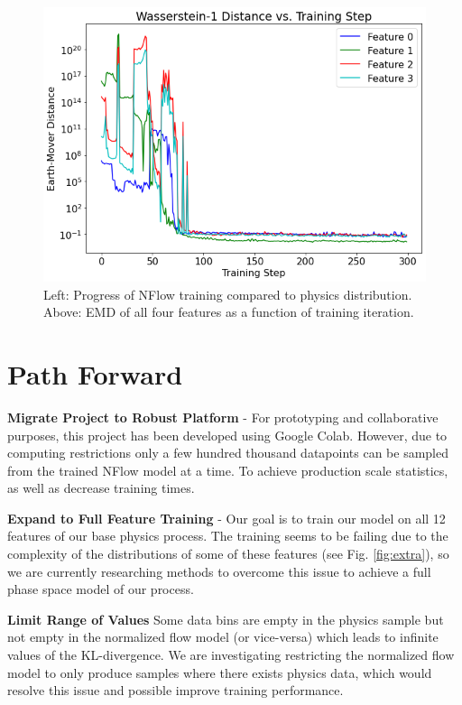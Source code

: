 \begin{figure}[!ht]
\begin{minipage}{0.4\textwidth}
        \centering
        \includegraphics[width=.98\textwidth,trim={0 0 0 0},clip]{pictures/milestoneR2/w1.png}
        \caption{Left: Progress of NFlow training compared to physics distribution. Above: EMD of all four features as a function of training iteration.}
    \end{minipage}
    \label{fig:c}
\end{figure}


\section{Path Forward}
\textbf{Migrate Project to Robust Platform} - For prototyping and collaborative purposes, this project has been developed using Google Colab. However, due to computing restrictions only a few hundred thousand datapoints can be sampled from the trained NFlow model at a time. To achieve production scale statistics, as well as decrease training times. 

\textbf{Expand to Full Feature Training} - Our goal is to train our model on all 12 features of our base physics process. The training seems to be failing due to the complexity of the distributions of some of these features (see Fig. \ref{fig:extra}), so we are currently researching methods to overcome this issue to achieve a full phase space model of our process.

\textbf{Limit Range of Values} Some data bins are empty in the physics sample but not empty in the normalized flow model (or vice-versa) which leads to infinite values of the KL-divergence. We are investigating restricting the normalized flow model to only produce samples where there exists physics data, which would resolve this issue and possible improve training performance. 

